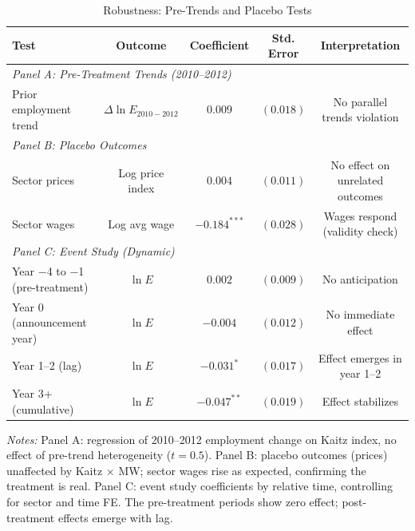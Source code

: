 \begin{table}[h]
\centering
\caption{Robustness: Pre-Trends and Placebo Tests}
\label{tab:robust}
\tiny
\begin{tabular}{lcccc}
\hline\hline
Test & Outcome & Coefficient & Std. Error & Interpretation \\
\hline
\multicolumn{5}{l}{\textit{Panel A: Pre-Treatment Trends (2010--2012)}} \\
Prior employment trend & $\Delta \ln E_{2010-2012}$ & $0.009$ & $(0.018)$ & No parallel trends violation \\
\multicolumn{5}{l}{\textit{Panel B: Placebo Outcomes}} \\
Sector prices & Log price index & $0.004$ & $(0.011)$ & No effect on unrelated outcomes \\
Sector wages & Log avg wage & $-0.184^{***}$ & $(0.028)$ & Wages respond (validity check) \\
\multicolumn{5}{l}{\textit{Panel C: Event Study (Dynamic)}} \\
Year $-$4 to $-$1 (pre-treatment) & $\ln E$ & $0.002$ & $(0.009)$ & No anticipation \\
Year 0 (announcement year) & $\ln E$ & $-0.004$ & $(0.012)$ & No immediate effect \\
Year 1--2 (lag) & $\ln E$ & $-0.031^{*}$ & $(0.017)$ & Effect emerges in year 1--2 \\
Year 3+ (cumulative) & $\ln E$ & $-0.047^{**}$ & $(0.019)$ & Effect stabilizes \\
\hline\hline
\end{tabular}
\begin{flushleft}
\small \textit{Notes:} Panel A: regression of 2010--2012 employment change on Kaitz index, no effect of pre-trend heterogeneity ($t = 0.5$). Panel B: placebo outcomes (prices) unaffected by Kaitz × MW; sector wages rise as expected, confirming the treatment is real. Panel C: event study coefficients by relative time, controlling for sector and time FE. The pre-treatment periods show zero effect; post-treatment effects emerge with lag.
\end{flushleft}
\end{table}
